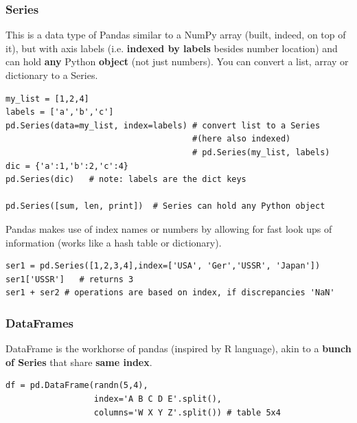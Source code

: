 \documentclass[12pt]{article}
\begin{document}
\subsubsection{Series}
This is a data type of Pandas similar to a NumPy array (built, indeed, on top of it), but with axis labels (i.e. \textbf{indexed by labels} besides number location) and can hold \textbf{any} Python \textbf{object} (not just numbers).
You can convert a list, array or dictionary to a Series. 
\begin{lstlisting}
my_list = [1,2,4]
labels = ['a','b','c']
pd.Series(data=my_list, index=labels) # convert list to a Series 
                                      #(here also indexed)
                                      # pd.Series(my_list, labels)   
dic = {'a':1,'b':2,'c':4}
pd.Series(dic)   # note: labels are the dict keys

pd.Series([sum, len, print])  # Series can hold any Python object
\end{lstlisting}

Pandas makes use of index names or numbers by allowing for fast look ups of information (works like a hash table or dictionary).
\begin{lstlisting}
ser1 = pd.Series([1,2,3,4],index=['USA', 'Ger','USSR', 'Japan'])     
ser1['USSR']   # returns 3
ser1 + ser2 # operations are based on index, if discrepancies 'NaN'
\end{lstlisting}

\subsubsection{DataFrames}
DataFrame is the workhorse of pandas (inspired by R language), akin to a \textbf{bunch of Series} that share \textbf{same index}.
\begin{lstlisting}
df = pd.DataFrame(randn(5,4), 
                  index='A B C D E'.split(), 
                  columns='W X Y Z'.split()) # table 5x4
\end{lstlisting}
\end{document}
